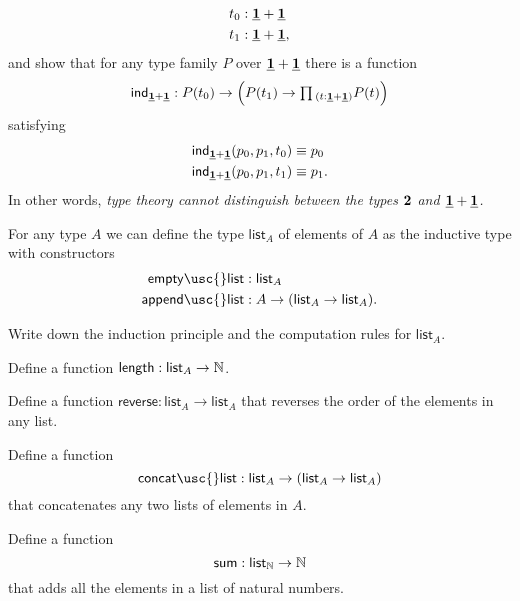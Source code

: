 \begin{exercises}
  \begin{align*}
    t_0 & : \underline{\mathbf{1}} + \underline{\mathbf{1}} \\
    t_1 & : \underline{\mathbf{1}} + \underline{\mathbf{1}},
  \end{align*}
  and show that for any type family $P$ over $\underline{\mathbf{1}}+\underline{\mathbf{1}}$ there is a function
  \begin{align*}
    \ind{\unit+\unit}:P(t_0)\to \Big(P(t_1)\to \prd{t:\unit+\unit}P(t)\Big)
  \end{align*}
  satisfying
  \begin{align*}
    \mathsf{ind}_{\underline{\mathbf{1}}+\underline{\mathbf{1}}}(p_0,p_1,t_0) & \equiv p_0 \\
    \mathsf{ind}_{\underline{\mathbf{1}}+\underline{\mathbf{1}}}(p_0,p_1,t_1) & \equiv p_1.
  \end{align*}
  In other words, \emph{type theory cannot distinguish between the types $\mathbf{2}$ and $\underline{\mathbf{1}}+\underline{\mathbf{1}}$.}
\item For any type $A$ we can define the type $\mathsf{list}_A$ of  elements of $A$ as the inductive type with constructors
  \begin{align*}
    \mathsf{empty\usc{}list} & : \mathsf{list}_A \\
    \mathsf{append\usc{}list} & : A \to (\mathsf{list}_A \to \mathsf{list}_A).
  \end{align*}
  \begin{subexenum}
  \item Write down the induction principle and the computation rules for $\mathsf{list}_A$.
  \item Define a function $\mathsf{length}:\mathsf{list}_A\to{\mathbb{N}}$.
  \item Define a function $\mathsf{reverse} : \mathsf{list}_A \to \mathsf{list}_A$ that reverses the order of the elements in any list.
  \item Define a function
    \begin{equation*}
      \mathsf{concat\usc{}list} : \mathsf{list}_A \to (\mathsf{list}_A \to \mathsf{list}_A)
    \end{equation*}
    that concatenates any two lists of elements in $A$.
  \item Define a function
    \begin{equation*}
      \mathsf{sum} : \mathsf{list}_{\mathbb{N}} \to {\mathbb{N}}
    \end{equation*}
    that adds all the elements in a list of natural numbers.
  \end{subexenum}
\end{exercises}
